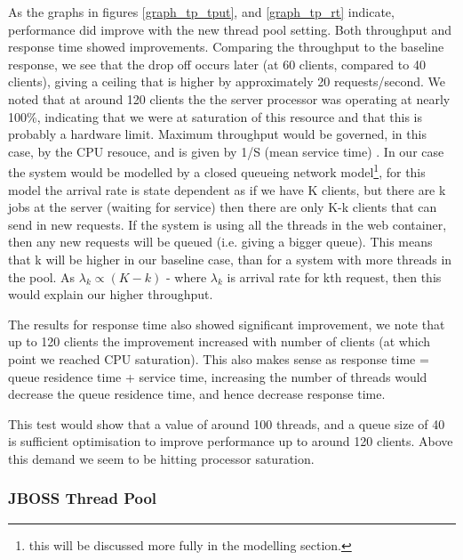 As the graphs in figures \ref{graph_tp_tput}, and \ref{graph_tp_rt} indicate, performance did improve with the new thread pool setting. Both throughput and response time showed improvements. Comparing the throughput to the baseline response, we see that the drop off occurs later (at 60 clients, compared to 40 clients), giving a ceiling that is higher by approximately 20 requests/second. We noted that at around 120 clients the the server processor was operating at nearly 100\%, indicating that we were at saturation of this resource and that this is probably a hardware limit. Maximum throughput would be governed, in this case, by the CPU resouce, and is given by 1/S (mean service time) \cite{model_server_settings_jee}\cite{performance_solutions}. In our case the system would be modelled by a closed queueing network model\footnote{this will be discussed more fully in the modelling section.}, for this model the arrival rate is state dependent as if we have K clients, but there are k jobs at the server (waiting for service) then there are only K-k clients that can send in new requests\cite{model_server_settings_jee}. If the system is using all the threads in the web container, then any new requests will be queued (i.e. giving a bigger queue). This means that k will be higher in our baseline case, than for a system with more threads in the pool. As \begin{math}\lambda_{k} \propto (K-k)\end{math} - where \begin{math}\lambda_{k}\end{math} is arrival rate for kth request\cite{model_server_settings_jee}, then this would explain our higher throughput.

The results for response time also showed significant improvement, we note that up to 120 clients the improvement increased with number of clients (at which point we reached CPU saturation). This also makes sense as response time = queue residence time + service time, increasing the number of threads would decrease the queue residence time, and hence decrease response time. 

This test would show that a value of around 100 threads, and a queue size of 40 is sufficient optimisation to improve performance up to around 120 clients. Above this demand we seem to be hitting processor saturation.

\subsubsection*{JBOSS Thread Pool}

